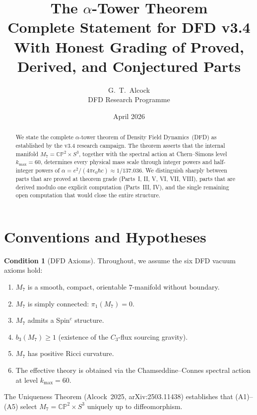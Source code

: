 \documentclass[11pt]{article}
\title{\textbf{The $\alpha$-Tower Theorem}\\[6pt]
\large Complete Statement for DFD v3.4\\[3pt]
\normalsize With Honest Grading of Proved, Derived, and Conjectured Parts}
\author{G.~T.~Alcock\\[3pt]
\small DFD Research Programme}
\date{April 2026}
\theoremstyle{definition}
\newtheorem{condition}[theorem]{Condition}
\theoremstyle{remark}
\newcommand{\CP}{\mathbb{CP}}
\begin{document}
\maketitle

\begin{abstract}
We state the complete $\alpha$-tower theorem of Density Field
Dynamics~(DFD) as established by the v3.4 research campaign.  The
theorem asserts that the internal manifold $M_7 = \CP^2 \times S^3$,
together with the spectral action at Chern--Simons level
$k_{\max} = 60$, determines every physical mass scale through integer
powers and half-integer powers of $\alpha = e^2/(4\pi\epsilon_0 \hbar c)
\approx 1/137.036$.  We distinguish sharply between parts that are
proved at theorem grade (Parts~I, II, V, VI, VII, VIII), parts that
are derived modulo one explicit computation (Parts~III, IV), and
the single remaining open computation that would close the entire
structure.
\end{abstract}

\tableofcontents
\newpage

\section{Conventions and Hypotheses}
\label{sec:conventions}

\begin{condition}[DFD Axioms]\label{cond:axioms}
Throughout, we assume the six DFD vacuum axioms hold:
\begin{enumerate}
\item[(A1)] $M_7$ is a smooth, compact, orientable $7$-manifold without boundary.
\item[(A2)] $M_7$ is simply connected: $\pi_1(M_7) = 0$.
\item[(A3)] $M_7$ admits a Spin$^c$ structure.
\item[(A4)] $b_3(M_7) \geq 1$ (existence of the $C_3$-flux sourcing gravity).
\item[(A5)] $M_7$ has positive Ricci curvature.
\item[(A6)] The effective theory is obtained via the Chamseddine--Connes
spectral action at level $k_{\max} = 60$.
\end{enumerate}
The Uniqueness Theorem (Alcock~2025, arXiv:2503.11438) establishes
that (A1)--(A5) select $M_7 = \CP^2 \times S^3$ uniquely up to
diffeomorphism.
\end{condition}
\end{document}
